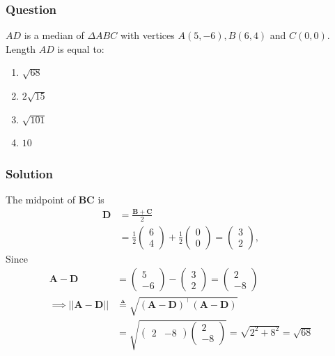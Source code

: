 \documentclass{beamer}
\providecommand{\brak}[1]{\ensuremath{\left(#1\right)}}
\theoremstyle{remark}
\newcommand{\myvec}[1]{\ensuremath{\begin{pmatrix}#1\end{pmatrix}}}
\let\vec\mathbf
\begin{document}
%
\begin{frame}
\frametitle{Question }
$AD$ is a median of $\Delta ABC$ with vertices $A\brak{5,-6}, B\brak{6,4}$ and $C\brak{0,0}$. Length $AD$ is equal to:
\begin{enumerate}
\item  $\sqrt{68}$
\item  $2\sqrt{15}$
\item  $\sqrt{101}$
\item  $10$
\end{enumerate}
\end{frame}
\begin{frame}
\frametitle{Solution}
The midpoint of $\vec{BC}$ is 
\begin{align}
    \vec{D} &= \frac{\vec{B} + \vec{C}}{2}\\
    &=\frac{1}{2}\myvec{
        6\\
        4
    }
    +
   \frac{1}{2} \myvec{
        0\\
        0
    } = \myvec{
        3\\
        2
    },
\end{align}
Since
\begin{align}
\vec{A}-\vec{D} &= \myvec{
        5\\
        -6
    }-\myvec{
        3\\
        2
    }=
    \myvec{
        2\\
        -8
    }
\\    \implies \lvert\lvert \vec{A}-\vec{D} \rvert\rvert &\triangleq \sqrt{\brak{\vec{A}-\vec{D}}^\top\brak{\vec{A}-\vec{D}}} \label{9}\\
    &= \sqrt{\myvec{
        2 & -8 
    }
    \myvec{
        2\\
        -8
    }}
    = \sqrt{2^2+8^2} =\sqrt{68} 
\end{align}
\end{frame}
\end{document}

